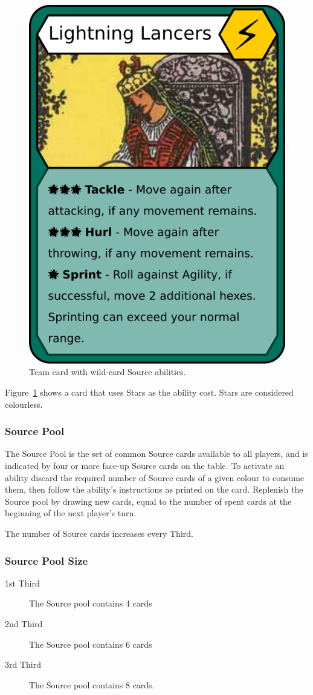 \begin{figure}
    \centering
    \includegraphics{graphics/yellow-team.png}
    \caption{Team card with wild-card Source abilities.}
    \label{fig:ability-example-2}
\end{figure}

Figure~\ref{fig:ability-example-2} shows a card that uses Stars as the ability cost.
Stars are considered colourless.
\subsubsection{Source Pool}
The Source Pool is the set of common Source cards available to all players, and is indicated by four or more face-up Source cards on the table.
To activate an ability discard the required number of Source cards of a given colour to consume them, then follow the ability's instructions as printed on the card.
Replenish the Source pool by drawing new cards, equal to the number of spent cards at the beginning of the next player's turn.

The number of Source cards increases every Third.
\subsubsection{Source Pool Size}
\begin{description}
    \item[1st Third] The Source pool contains 4 cards
    \item[2nd Third] The Source pool contains 6 cards
    \item[3rd Third] The Source pool contains 8 cards.
\end{description}